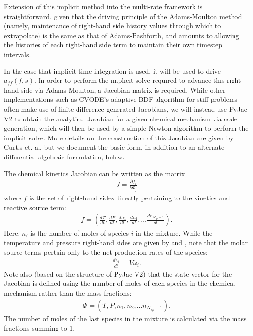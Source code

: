 Extension of this implicit method into the multi-rate framework is
straightforward, given that the driving principle of the Adams-Moulton
method (namely, maintenance of right-hand side history values through
which to extrapolate) is the same as that of Adams-Bashforth, and amounts to
allowing the histories of each right-hand side term to maintain their
own timestep intervals.

In the case that implicit time integration is used, it will be used
to drive $a_{ff}(f,s)$. In order to perform the implicit solve required
to advance this right-hand side via Adams-Moulton, a Jacobian matrix
is required. While other implementations such as CVODE's adaptive BDF
algorithm for stiff problems often make use of finite-difference generated
Jacobians, we will instead use PyJac-V2 \cite{curtis2018using} to obtain the analytical Jacobian
for a given chemical mechanism via code generation, which will then
be used by a simple Newton algorithm to perform the implicit solve. More
details on the construction of this Jacobian are given by Curtis et. al, but we
document the basic form, in addition to an alternate differential-algebraic
formulation, below.

The chemical kinetics Jacobian can be written as the matrix
\begin{align}
J = \frac{\partial f_{i}}{\partial \Phi_{j}} \label{eq:jac}
\end{align}
where $f$ is the set of right-hand sides directly pertaining
to the kinetics and reactive source term:
\begin{align}
f = \left(\frac{dT}{dt}, \frac{dP}{dt}, \frac{dn_{1}}{dt}, \frac{dn_{2}}{dt}, \hdots \frac{dn_{N_{sp}-1}}{dt} \right).
\end{align}
Here, $n_{i}$ is the number of moles of species $i$ in the mixture.
While the temperature and pressure right-hand sides are given by  and ,
note that the molar source terms pertain only to the net production rates of the species:
\begin{align}
\frac{dn_{i}}{dt} = V \dot{\omega}_{i}.
\end{align}
Note also (based on the structure of PyJac-V2) that the state vector for the
Jacobian is defined using the number of moles of each species in the chemical
mechanism rather than the mass fractions:
\begin{align}
\Phi = \left(T, P, n_{1}, n_{2}, \hdots n_{N_{sp}-1}\right).
\end{align}
The number of moles of the last species in the mixture is calculated
via the mass fractions summing to 1.

